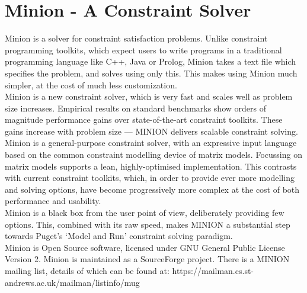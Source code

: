 \newpage
\section{Minion - A Constraint Solver}
Minion is a solver for constraint satisfaction problems. Unlike constraint programming toolkits, which expect users to write programs in a traditional programming language like C++, Java or Prolog, Minion takes a text file which specifies the problem, and solves using only this. This makes using Minion much simpler, at the cost of much less customization.\\

\noindent Minion is a new constraint solver, which is very fast and scales well as problem size increases. Empirical results on standard benchmarks show orders of magnitude performance gains over state-of-the-art constraint toolkits. These gains increase with problem size --- MINION delivers scalable constraint solving.\\

\noindent Minion is a general-purpose constraint solver, with an expressive input language based on the common constraint modelling device of matrix models. Focussing on matrix models supports a lean, highly-optimised implementation. This contrasts with current constraint toolkits, which, in order to provide ever more modelling and solving options, have become progressively more complex at the cost of both performance and usability.\\

\noindent Minion is a black box from the user point of view, deliberately providing few options. This, combined with its raw speed, makes MINION a substantial step towards Puget's `Model and Run' constraint solving paradigm. \\

\noindent Minion is Open Source software, licensed under GNU General Public License Version 2. Minion is maintained as a SourceForge project. There is a MINION mailing list, details of which can be found at: https://mailman.cs.st-andrews.ac.uk/mailman/listinfo/mug\\
